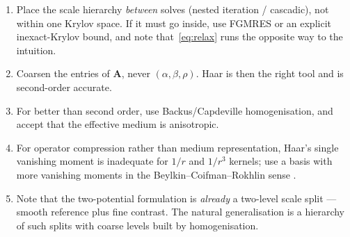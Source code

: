 \documentclass[11pt,a4paper]{article}
\newcommand{\bA}{\mathbf{A}}
\begin{document}
\begin{enumerate}
\item Place the scale hierarchy \emph{between} solves (nested iteration /
      cascadic), not within one Krylov space.  If it must go inside, use FGMRES
      or an explicit inexact-Krylov bound, and note that~\eqref{eq:relax} runs
      the opposite way to the intuition.
\item Coarsen the entries of $\bA$, never $(\alpha,\beta,\rho)$.  Haar is then
      the right tool and is second-order accurate.
\item For better than second order, use Backus/Capdeville homogenisation, and
      accept that the effective medium is anisotropic.
\item For operator compression rather than medium representation, Haar's single
      vanishing moment is inadequate for $1/r$ and $1/r^3$ kernels; use a basis
      with more vanishing moments in the Beylkin--Coifman--Rokhlin sense
      \citep{beylkin1991}.
\item Note that the two-potential formulation is \emph{already} a two-level
      scale split --- smooth reference plus fine contrast.  The natural
      generalisation is a hierarchy of such splits with coarse levels built by
      homogenisation.
\end{enumerate}
\end{document}
